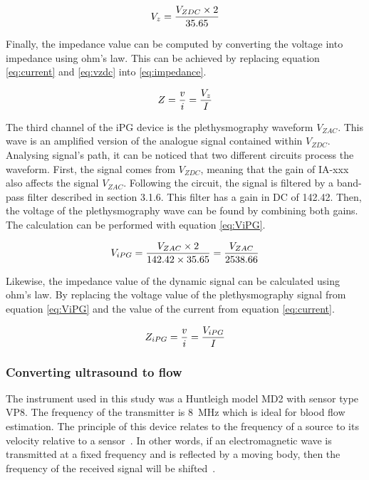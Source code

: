 
\begin{align}
	\label{eq:vzdc}
	V_z = \frac{V_{ZDC} \times 2}{35.65} \tagaddtext{[\si{\volt}]}
\end{align}

Finally, the impedance value can be computed by converting the voltage into impedance using ohm's law. This can be achieved by replacing equation \ref{eq:current} and \ref{eq:vzdc} into \ref{eq:impedance}.

\begin{align}
	\label{eq:impedance}
	Z = \frac{v}{i}=\frac{V_z}{I} \tagaddtext{[\si{\ohm}]}
\end{align}

The third channel of the iPG device is the plethysmography waveform $V_{ZAC}$. This wave is an amplified version of the analogue signal contained within $V_{ZDC}$. Analysing signal's path, it can be noticed that two different circuits process the waveform. First, the signal comes from $V_{ZDC}$, meaning that the gain of IA-xxx also affects the signal $V_{ZAC}$. Following the circuit, the signal is filtered by a band-pass filter described in section 3.1.6. This filter has a gain in DC of 142.42. Then, the voltage of the plethysmography wave can be found by combining both gains. The calculation can be performed with equation \ref{eq:ViPG}.

\begin{align}
	\label{eq:ViPG}
	V_{iPG} = \frac{V_{ZAC} \times 2}{142.42 \times 35.65}=\frac{V_{ZAC}}{2538.66} \tagaddtext{[\si{\volt}]}
\end{align}


Likewise, the impedance value of the dynamic signal can be calculated using ohm's law. By replacing the voltage value of the plethysmography signal from equation \ref{eq:ViPG} and the value of the current from equation \ref{eq:current}.

\begin{align}
	\label{eq:zipg}
	Z_{iPG}=\frac{v}{i} = \frac{V_{iPG}}{I} \tagaddtext{[\si{\ohm}]}
\end{align}

\subsubsection{Converting ultrasound to flow}
\label{sectionUD}
The instrument used in this study was a Huntleigh model MD2 with sensor type VP8. The frequency of the transmitter is \SI{8}{\mega\hertz} which is ideal for blood flow estimation. The principle of this device relates to the frequency of a source to its velocity relative to a sensor~\cite{surgeonhand2002Hand}.  In other words, if an electromagnetic wave is transmitted at a fixed frequency and is reflected by a moving body, then the frequency of the received signal will be shifted~\cite{ht:MD2}.  

